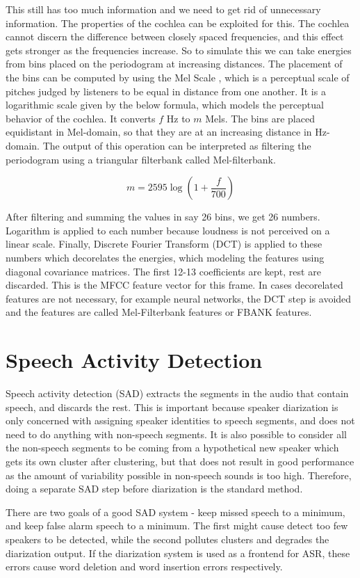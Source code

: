 This still has too much information and we need to get rid of unnecessary information. The properties of the cochlea can be exploited for this. The cochlea cannot discern the difference between closely spaced frequencies, and this effect gets stronger as the frequencies increase. So to simulate this we can take energies from bins placed on the periodogram at increasing distances. The placement of the bins can be computed by using the Mel Scale \cite{logan2000mel}, which is a perceptual scale of pitches judged by listeners to be equal in distance from one another. It is a logarithmic scale given by the below formula, which models the perceptual behavior of the cochlea. It converts $f$ Hz to $m$ Mels. The bins are placed equidistant in Mel-domain, so that they are at an increasing distance in Hz-domain. The output of this operation can be interpreted as filtering the periodogram using a triangular filterbank called Mel-filterbank.

$$ m = 2595 \log \left( 1+\frac{f}{700} \right) $$

After filtering and summing the values in say 26 bins, we get 26 numbers. Logarithm is applied to each number because loudness is not perceived on a linear scale. Finally, Discrete Fourier Transform (DCT) is applied to these numbers which decorelates the energies, which modeling the features using diagonal covariance matrices. The first 12-13 coefficients are kept, rest are discarded. This is the MFCC feature vector for this frame. In cases decorelated features are not necessary, for example neural networks, the DCT step is avoided and the features are called Mel-Filterbank features or FBANK features.

\section{Speech Activity Detection}
Speech activity detection (SAD) extracts the segments in the audio that contain speech, and discards the rest. This is important because speaker diarization is only concerned with assigning speaker identities to speech segments, and does not need to do anything with non-speech segments. It is also possible to consider all the non-speech segments to be coming from a hypothetical new speaker which gets its own cluster after clustering, but that does not result in good performance as the amount of variability possible in non-speech sounds is too high. Therefore, doing a separate SAD step before diarization is the standard method.

There are two goals of a good SAD system - keep missed speech to a minimum, and keep false alarm speech to a minimum. The first might cause detect too few speakers to be detected, while the second pollutes clusters and degrades the diarization output. If the diarization system is used as a frontend for ASR, these errors cause word deletion and word insertion errors respectively.

